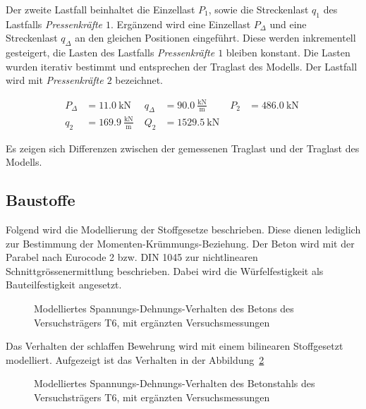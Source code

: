 \documentclass[
  11pt,
  letterpaper,
]{scrreprt}
\begin{document}
Der zweite Lastfall beinhaltet die Einzellast \(P_{1}\), sowie die
Streckenlast \(q_1\) des Lastfalls \emph{Pressenkräfte \(1\)}. Ergänzend
wird eine Einzellast \(P_{\Delta}\) und eine Streckenlast \(q_{\Delta}\)
an den gleichen Positionen eingeführt. Diese werden inkrementell
gesteigert, die Lasten des Lastfalls \emph{Pressenkräfte \(1\)} bleiben
konstant. Die Lasten wurden iterativ bestimmt und entsprechen der
Traglast des Modells. Der Lastfall wird mit \emph{Pressenkräfte \(2\)}
bezeichnet.

$$
\begin{aligned}
P_{\Delta} &= 11.0\ \mathrm{kN} \; 
 &q_{\Delta} &= 90.0\ \frac{\mathrm{kN}}{\mathrm{m}} \; 
 &P_{2} &= 486.0\ \mathrm{kN} \; 
\\[10pt]
 q_{2} &= 169.9\ \frac{\mathrm{kN}}{\mathrm{m}} \; 
 &Q_{2} &= 1529.5\ \mathrm{kN} \;
\end{aligned}
$$

Es zeigen sich Differenzen zwischen der gemessenen Traglast und der
Traglast des Modells.

\subsection{Baustoffe}\label{baustoffe}

Folgend wird die Modellierung der Stoffgesetze beschrieben. Diese dienen
lediglich zur Bestimmung der Momenten-Krümmungs-Beziehung. Der Beton
wird mit der Parabel nach Eurocode 2 bzw. DIN 1045 zur nichtlinearen
Schnittgrössenermittlung beschrieben. Dabei wird die Würfelfestigkeit
als Bauteilfestigkeit angesetzt.

\begin{figure}[H]


\caption{\label{fig-sigma_epc_t6}Modelliertes
Spannungs-Dehnungs-Verhalten des Betons des Versuchsträgers T6, mit
ergänzten Versuchsmessungen}

\end{figure}%

Das Verhalten der schlaffen Bewehrung wird mit einem bilinearen
Stoffgesetzt modelliert. Aufgezeigt ist das Verhalten in der
Abbildung~\ref{fig-sigma_eps_t6}

\begin{figure}[H]


\caption{\label{fig-sigma_eps_t6}Modelliertes
Spannungs-Dehnungs-Verhalten des Betonstahls des Versuchsträgers T6, mit
ergänzten Versuchsmessungen}

\end{figure}%
\end{document}
